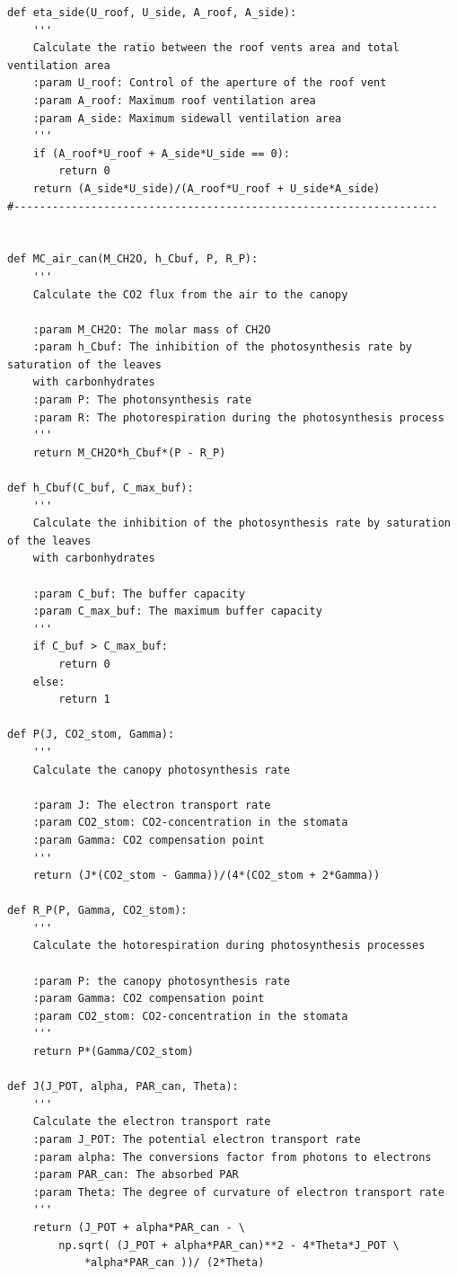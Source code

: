 \documentclass[a4paper]{article}
\begin{document}
\begin{appendices}
\begin{verbatim}
def eta_side(U_roof, U_side, A_roof, A_side):
    '''
    Calculate the ratio between the roof vents area and total ventilation area
    :param U_roof: Control of the aperture of the roof vent
    :param A_roof: Maximum roof ventilation area
    :param A_side: Maximum sidewall ventilation area
    '''
    if (A_roof*U_roof + A_side*U_side == 0):
        return 0
    return (A_side*U_side)/(A_roof*U_roof + U_side*A_side) 
#------------------------------------------------------------------


def MC_air_can(M_CH2O, h_Cbuf, P, R_P):
    '''
    Calculate the CO2 flux from the air to the canopy

    :param M_CH2O: The molar mass of CH2O
    :param h_Cbuf: The inhibition of the photosynthesis rate by saturation of the leaves
    with carbonhydrates
    :param P: The photonsynthesis rate
    :param R: The photorespiration during the photosynthesis process
    '''
    return M_CH2O*h_Cbuf*(P - R_P)

def h_Cbuf(C_buf, C_max_buf):
    '''
    Calculate the inhibition of the photosynthesis rate by saturation of the leaves
    with carbonhydrates

    :param C_buf: The buffer capacity
    :param C_max_buf: The maximum buffer capacity
    '''
    if C_buf > C_max_buf:
        return 0
    else:
        return 1

def P(J, CO2_stom, Gamma):
    '''
    Calculate the canopy photosynthesis rate

    :param J: The electron transport rate
    :param CO2_stom: CO2-concentration in the stomata
    :param Gamma: CO2 compensation point
    '''
    return (J*(CO2_stom - Gamma))/(4*(CO2_stom + 2*Gamma))

def R_P(P, Gamma, CO2_stom):
    '''
    Calculate the hotorespiration during photosynthesis processes

    :param P: the canopy photosynthesis rate
    :param Gamma: CO2 compensation point
    :param CO2_stom: CO2-concentration in the stomata
    '''
    return P*(Gamma/CO2_stom)

def J(J_POT, alpha, PAR_can, Theta):
    '''
    Calculate the electron transport rate
    :param J_POT: The potential electron transport rate
    :param alpha: The conversions factor from photons to electrons
    :param PAR_can: The absorbed PAR
    :param Theta: The degree of curvature of electron transport rate
    '''
    return (J_POT + alpha*PAR_can - \
        np.sqrt( (J_POT + alpha*PAR_can)**2 - 4*Theta*J_POT \
            *alpha*PAR_can ))/ (2*Theta)


\end{verbatim}
\end{appendices}
\end{document}
